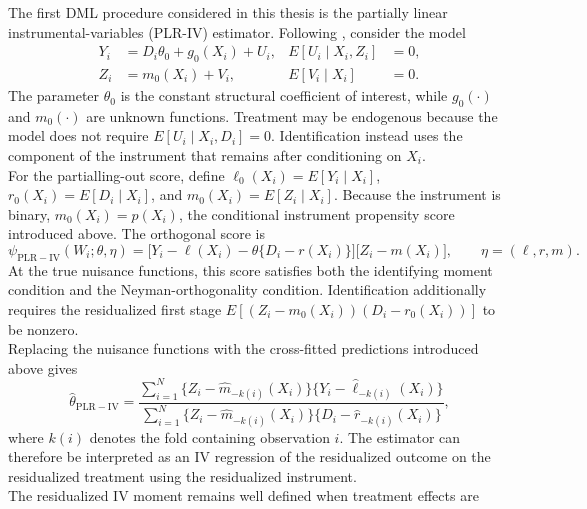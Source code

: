 \documentclass[12pt, a4paper, oneside]{article}
\theoremstyle{plain}
\theoremstyle{definition}
\begin{document}
The first DML procedure considered in this thesis is the partially linear
instrumental-variables (PLR-IV) estimator. Following
\citet[Section~4.2]{chernozhukov2018double}, consider the model
\begin{align}
    Y_i
    &=
    D_i\theta_0+g_0(X_i)+U_i,
    &
    E[U_i\mid X_i,Z_i]
    &=
    0,
    \label{eq:pliv_model}\\
    Z_i
    &=
    m_0(X_i)+V_i,
    &
    E[V_i\mid X_i]
    &=
    0.
    \label{eq:pliv_instrument}
\end{align}
The parameter $\theta_0$ is the constant structural coefficient of interest,
while $g_0(\cdot)$ and $m_0(\cdot)$ are unknown functions. Treatment may be
endogenous because the model does not require
$E[U_i\mid X_i,D_i]=0$. Identification instead uses the component of the
instrument that remains after conditioning on $X_i$.\\
For the partialling-out score, define
$\ell_0(X_i)=E[Y_i\mid X_i]$,
$r_0(X_i)=E[D_i\mid X_i]$, and
$m_0(X_i)=E[Z_i\mid X_i]$. Because the instrument is binary,
$m_0(X_i)=p(X_i)$, the conditional instrument propensity score introduced
above. The orthogonal score is
\begin{equation}
    \psi_{\mathrm{PLR-IV}}(W_i;\theta,\eta)
    =
    \bigl[Y_i-\ell(X_i)-\theta\{D_i-r(X_i)\}\bigr]
    \bigl[Z_i-m(X_i)\bigr],
    \qquad
    \eta=(\ell,r,m).
    \label{eq:pliv_score}
\end{equation}
At the true nuisance functions, this score satisfies both the identifying
moment condition and the Neyman-orthogonality condition. Identification
additionally requires the residualized first stage
$E[(Z_i-m_0(X_i))(D_i-r_0(X_i))]$ to be nonzero. \\
Replacing the nuisance functions with the cross-fitted predictions introduced
above gives
\begin{equation}
    \widehat{\theta}_{\mathrm{PLR-IV}}
    =
    \frac{
        \sum_{i=1}^{N}
        \{Z_i-\widehat m_{-k(i)}(X_i)\}
        \{Y_i-\widehat\ell_{-k(i)}(X_i)\}
    }{
        \sum_{i=1}^{N}
        \{Z_i-\widehat m_{-k(i)}(X_i)\}
        \{D_i-\widehat r_{-k(i)}(X_i)\}
    },
    \label{eq:pliv_dml_estimator}
\end{equation}
where $k(i)$ denotes the fold containing observation $i$. The estimator can
therefore be interpreted as an IV regression of the residualized outcome on
the residualized treatment using the residualized instrument.\\
The residualized IV moment remains well defined when treatment effects are
\end{document}
